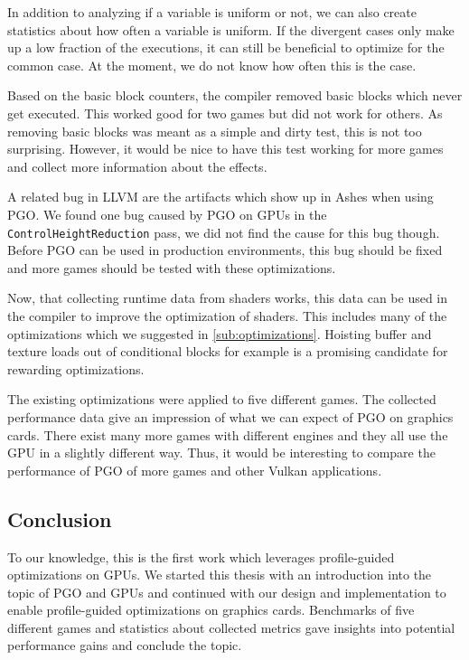 In addition to analyzing if a variable is uniform or not, we can also create statistics about how often a variable is uniform.
If the divergent cases only make up a low fraction of the executions, it can still be beneficial to optimize for the common case.
At the moment, we do not know how often this is the case.

Based on the basic block counters, the compiler removed basic blocks which never get executed.
This worked good for two games but did not work for others.
As removing basic blocks was meant as a simple and dirty test, this is not too surprising.
However, it would be nice to have this test working for more games and collect more information about the effects.

A related bug in LLVM are the artifacts which show up in Ashes when using PGO.
We found one bug caused by PGO on GPUs in the \texttt{ControlHeightReduction} pass, we did not find the cause for this bug though.
Before PGO can be used in production environments, this bug should be fixed and more games should be tested with these optimizations.

Now, that collecting runtime data from shaders works, this data can be used in the compiler to improve the optimization of shaders.
This includes many of the optimizations which we suggested in \cref{sub:optimizations}.
Hoisting buffer and texture loads out of conditional blocks for example is a promising candidate for rewarding optimizations.

The existing optimizations were applied to five different games.
The collected performance data give an impression of what we can expect of PGO on graphics cards.
There exist many more games with different engines and they all use the GPU in a slightly different way.
Thus, it would be interesting to compare the performance of PGO of more games and other Vulkan applications.

\subsection{Conclusion}
\label{sub:conclusion}
To our knowledge, this is the first work which leverages profile-guided optimizations on GPUs.
We started this thesis with an introduction into the topic of PGO and GPUs and continued with our design and implementation to enable profile-guided optimizations on graphics cards.
Benchmarks of five different games and statistics about collected metrics gave insights into potential performance gains and conclude the topic.


